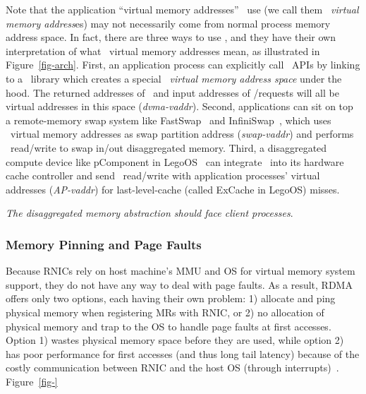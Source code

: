 Note that the application ``virtual memory addresses'' \sys\ use (we call them \textit{\sys\ virtual memory address}es) may not necessarily come from normal process memory address space.
In fact, there are three ways to use \sys, and they have their own interpretation of what \sys\ virtual memory addresses mean,
as illustrated in Figure~\ref{fig-arch}.
First, an application process can explicitly call \sys\ APIs by linking to a \sys\ library which creates a special \textit{\sys\ virtual memory address space}
under the hood. 
The returned addresses of \alloc\ and input addresses of \Cliosysread/\Cliosyswrite requests will all be virtual addresses in this space ({\em dvma-vaddr}).
Second, applications can sit on top a remote-memory swap system like FastSwap~\cite{FastSwap} and InfiniSwap~\cite{InfiniSwap},
which uses \sys\ virtual memory addresses as swap partition address ({\em swap-vaddr}) and performs \sys\ read/write to swap in/out disaggregated memory.
Third, a disaggregated compute device like pComponent in LegoOS~\cite{Shan18-OSDI} can integrate \sys\ into its hardware cache controller
and send \sys\ read/write with application processes' virtual addresses ({\em AP-vaddr}) for last-level-cache (called ExCache in LegoOS) misses. 



\textit{The disaggregated memory abstraction should face client processes}.


\subsubsection{Memory Pinning and Page Faults}
\label{sec:pagefault}

Because RNICs rely on host machine's MMU and OS for virtual memory system support, they do not have any way to deal with page faults.
As a result, RDMA offers only two options, each having their own problem:
1) allocate and ping physical memory when registering MRs with RNIC, 
or 2) no allocation of physical memory and trap to the OS to handle page faults at first accesses.
Option 1) wastes physical memory space before they are used, 
while option 2) has poor performance for first accesses (and thus long tail latency) 
because of the costly communication between RNIC and the host OS (through interrupts)~\cite{ASPLOS17}.
Figure~\ref{fig-} 

